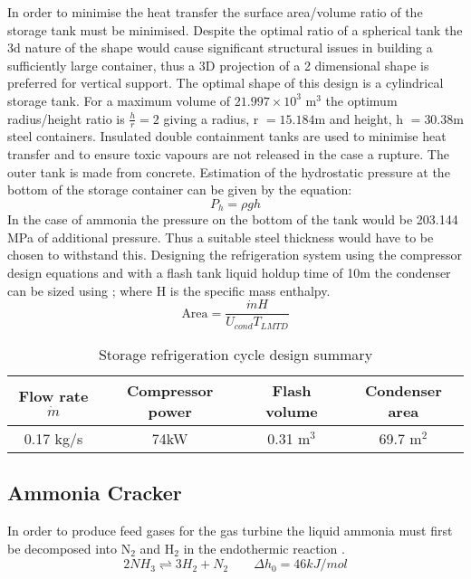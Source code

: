 In order to minimise the heat transfer the surface area/volume ratio of the storage tank must be minimised. Despite the optimal ratio of a spherical tank the 3d nature of the shape would cause significant structural issues in building a sufficiently large container, thus a 3D projection of a 2 dimensional shape is preferred for vertical support. The optimal shape of this design is a cylindrical storage tank. For a maximum volume of $21.997\times10^3$ m$^3$ the optimum radius/height ratio is $\frac{h}{r} = 2$ giving a radius, r $ = 15.184$m and height, h $ = 30.38$m steel containers. Insulated double containment tanks are used to minimise heat transfer and to ensure toxic vapours are not released in the case a rupture. The outer tank is made from concrete. Estimation of the hydrostatic pressure at the bottom of the storage container can be given by the equation:
\begin{equation}
P_h= \rho g h
\end{equation}
In the case of ammonia the pressure on the bottom of the tank would be 203.144 MPa of additional pressure. Thus a suitable steel thickness would have to be chosen to withstand this. Designing the refrigeration system using the compressor design equations and with a flash tank liquid holdup time of 10m the condenser can be sized using \cite{Morgan2013}; where H is the specific mass enthalpy.
\begin{equation}
	\text{Area} = \frac{\dot{m}H}{U_{cond}T_{LMTD}}
\end{equation}

\begin{table}[!htbp]
	\begin{center}
		\caption{Storage refrigeration cycle design summary}
		\begin{tabular}{ |c|c|c|c| }
			\hline
			
			Flow rate $\dot{m}$ & Compressor power&Flash volume &Condenser area\\
			\hline
			0.17 kg/s& 74kW & 0.31 m$^3$ &69.7 m$^2$ \\
		
			\hline
		\end{tabular}
	\end{center}
\end{table}
\subsection{Ammonia Cracker}
In order to produce feed gases for the gas turbine the liquid ammonia must first be decomposed into N$_2$ and H$_2$ in the endothermic reaction \cite{Kim2012}. 
\begin{equation}
2NH_3   \underset{ }{\stackrel{ }{\rightleftharpoons}}   3H_2 + N_2 \qquad \Delta h_0 = 46 kJ/mol 
\end{equation}

